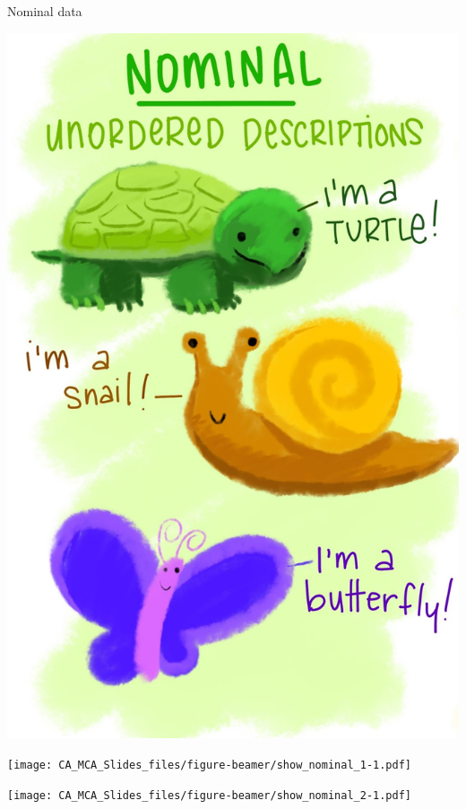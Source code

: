 \documentclass[
  ignorenonframetext,
]{beamer}
\begin{document}
\begin{frame}{Nominal data}
\protect\hypertarget{nominal-data}{}

\begin{center}
\includegraphics{../images/nom_copy.jpg}
\end{center}

\end{frame}

\begin{frame}

\texttt{[image: CA\_MCA\_Slides\_files/figure-beamer/show\_nominal\_1-1.pdf]}

\end{frame}

\begin{frame}

\texttt{[image: CA\_MCA\_Slides\_files/figure-beamer/show\_nominal\_2-1.pdf]}

\end{frame}
\end{document}
